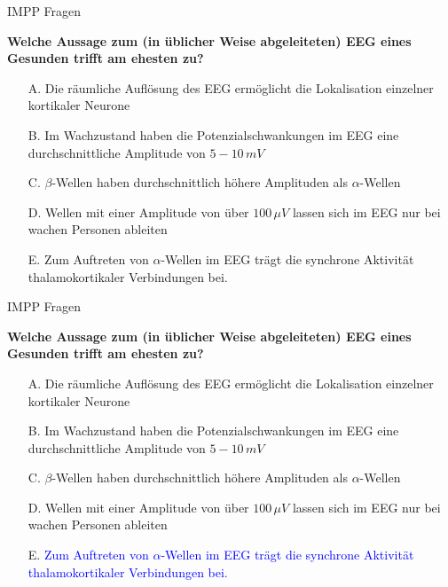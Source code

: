 \documentclass{beamer}
\begin{document}
\begin{frame}{IMPP Fragen}

\textbf{
Welche Aussage zum (in üblicher Weise abgeleiteten) EEG eines Gesunden trifft am ehesten zu?
} \\[0.2 cm]

\begin{itemize}
\item[A.] Die räumliche Auflösung des EEG ermöglicht die Lokalisation einzelner kortikaler Neurone
\item[B.] Im Wachzustand haben die Potenzialschwankungen im EEG eine durchschnittliche Amplitude von \(5-10\,mV\)
\item[C.] \(\beta\)-Wellen haben durchschnittlich höhere Amplituden als \(\alpha\)-Wellen
\item[D.] Wellen mit einer Amplitude von über \(100\,\mu V\) lassen sich im EEG nur bei wachen Personen ableiten
\item[E.] Zum Auftreten von \(\alpha\)-Wellen im EEG trägt die synchrone Aktivität thalamokortikaler Verbindungen bei. %

\end{itemize}

\end{frame}


\begin{frame}{IMPP Fragen}

\textbf{
Welche Aussage zum (in üblicher Weise abgeleiteten) EEG eines Gesunden trifft am ehesten zu?
} \\[0.2 cm]

\begin{itemize}
\item[A.] Die räumliche Auflösung des EEG ermöglicht die Lokalisation einzelner kortikaler Neurone
\item[B.] Im Wachzustand haben die Potenzialschwankungen im EEG eine durchschnittliche Amplitude von \(5-10\,mV\)
\item[C.] \(\beta\)-Wellen haben durchschnittlich höhere Amplituden als \(\alpha\)-Wellen
\item[D.] Wellen mit einer Amplitude von über \(100\,\mu V\) lassen sich im EEG nur bei wachen Personen ableiten
\item[E.] \textcolor{blue}{Zum Auftreten von \(\alpha\)-Wellen im EEG trägt die synchrone Aktivität thalamokortikaler Verbindungen bei.} %

\end{itemize}

\end{frame}
\end{document}
